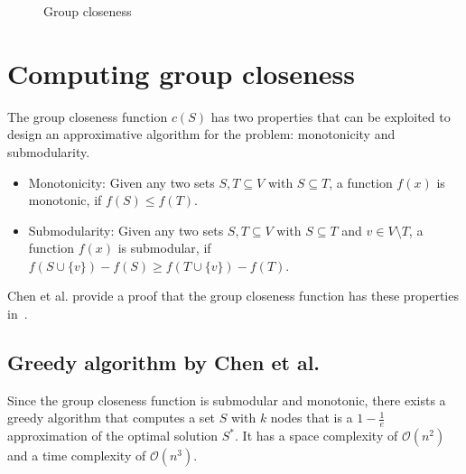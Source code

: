 \begin{figure}[h!]
\centering
{}
\caption{Group closeness}{}
\label{fig:groupCloseness}
\end{figure}

\section{Computing group closeness}
The group closeness function $c(S)$ has two properties that can be exploited to design an approximative algorithm for the problem: monotonicity and submodularity.

\begin{itemize}
	\item Monotonicity: Given any two sets $S, T \subseteq V$ with $S \subseteq T$, a function $f(x)$ is monotonic, if $f(S) \leq f(T)$.
	\item Submodularity: Given any two sets $S, T \subseteq V$ with $S \subseteq T$ and $v \in V \setminus T$, a function $f(x)$ is submodular, if $f(S \cup \{v\}) - f(S) \geq f(T \cup \{v\}) - f(T)$.
\end{itemize}
Chen et al. provide a proof that the group closeness function has these properties in~\cite{Chen2016}.

\subsection{Greedy algorithm by Chen et al.}
Since the group closeness function is submodular and monotonic, there exists a greedy algorithm that computes a set $S$ with $k$ nodes that is a $1 - \frac{1}{e}$ approximation of the optimal solution $S^*$. It has a space complexity of $\mathcal{O}(n^2)$ and a time complexity of $\mathcal{O}(n^3)$.

